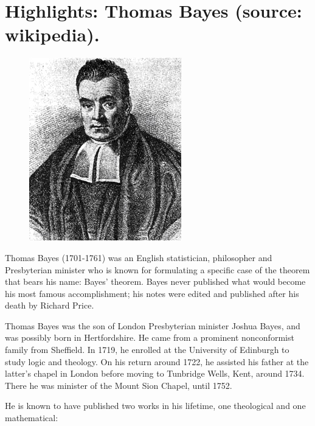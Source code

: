 \documentclass[english,graybox,envcountchap,envcountsame,sectrefs,shortlabels]{svmono}
\theoremstyle{style}
\begin{document}


\section*{Highlights: Thomas Bayes (source: wikipedia).}

\begin{figure} \centering

\includegraphics[scale=0.45]{bayes}

\end{figure}
Thomas Bayes (1701-1761) was an English statistician, philosopher and Presbyterian minister who is known for formulating a specific case of the theorem that bears his name: Bayes' theorem. Bayes never published what would become his most famous accomplishment; his notes were edited and published after his death by Richard Price.

Thomas Bayes was the son of London Presbyterian minister Joshua Bayes, and was possibly born in Hertfordshire. He came from a prominent nonconformist family from Sheffield. In 1719, he enrolled at the University of Edinburgh to study logic and theology. On his return around 1722, he assisted his father at the latter's chapel in London before moving to Tunbridge Wells, Kent, around 1734. There he was minister of the Mount Sion Chapel, until 1752.

He is known to have published two works in his lifetime, one theological and one mathematical:
\end{document}
